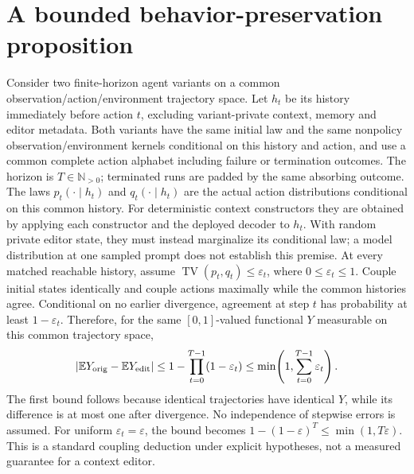 \section{A bounded behavior-preservation proposition}\label{sec:C17:bound}
Consider two finite-horizon agent variants on a common observation/action/environment trajectory space. Let $h_t$ be its history immediately before action $t$, excluding variant-private context, memory and editor metadata. Both variants have the same initial law and the same nonpolicy observation/environment kernels conditional on this history and action, and use a common complete action alphabet including failure or termination outcomes. The horizon is $T\in\mathbb N_{>0}$; terminated runs are padded by the same absorbing outcome. The laws $p_t(\cdot\mid h_t)$ and $q_t(\cdot\mid h_t)$ are the actual action distributions conditional on this common history. For deterministic context constructors they are obtained by applying each constructor and the deployed decoder to $h_t$. With random private editor state, they must instead marginalize its conditional law; a model distribution at one sampled prompt does not establish this premise. At every matched reachable history, assume $\operatorname{TV}(p_t,q_t)\leq\varepsilon_t$, where $0\leq\varepsilon_t\leq1$. Couple initial states identically and couple actions maximally while the common histories agree. Conditional on no earlier divergence, agreement at step $t$ has probability at least $1-\varepsilon_t$. Therefore, for the same $[0,1]$-valued functional $Y$ measurable on this common trajectory space,
\begin{equation}
 |\mathbb EY_{\rm orig}-\mathbb EY_{\rm edit}|
 \leq1-\prod_{t=0}^{T-1}(1-\varepsilon_t)
 \leq\min\!\left(1,\sum_{t=0}^{T-1}\varepsilon_t\right).
 \label{eq:C17:coupling}
\end{equation}
The first bound follows because identical trajectories have identical $Y$, while its difference is at most one after divergence. No independence of stepwise errors is assumed. For uniform $\varepsilon_t=\varepsilon$, the bound becomes $1-(1-\varepsilon)^T\leq\min(1,T\varepsilon)$. This is a standard coupling deduction under explicit hypotheses, not a measured guarantee for a context editor.

